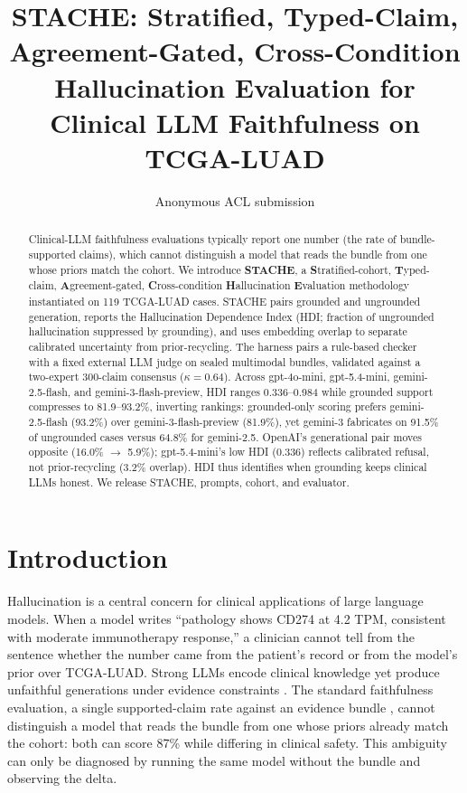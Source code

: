 \documentclass[11pt]{article}
\title{STACHE: Stratified, Typed-Claim, Agreement-Gated, Cross-Condition Hallucination Evaluation for Clinical LLM Faithfulness on TCGA-LUAD}
\author{Anonymous ACL submission}
\begin{document}
\maketitle

\begin{abstract}
Clinical-LLM faithfulness evaluations typically report one number (the rate of bundle-supported claims), which cannot distinguish a model that reads the bundle from one whose priors match the cohort. We introduce \textbf{STACHE}, a \textbf{S}tratified-cohort, \textbf{T}yped-claim, \textbf{A}greement-gated, \textbf{C}ross-condition \textbf{H}allucination \textbf{E}valuation methodology instantiated on 119 TCGA-LUAD cases. STACHE pairs grounded and ungrounded generation, reports the Hallucination Dependence Index (HDI; fraction of ungrounded hallucination suppressed by grounding), and uses embedding overlap to separate calibrated uncertainty from prior-recycling. The harness pairs a rule-based checker with a fixed external LLM judge on sealed multimodal bundles, validated against a two-expert 300-claim consensus ($\kappa=0.64$). Across gpt-4o-mini, gpt-5.4-mini, gemini-2.5-flash, and gemini-3-flash-preview, HDI ranges 0.336--0.984 while grounded support compresses to 81.9--93.2\%, inverting rankings: grounded-only scoring prefers gemini-2.5-flash (93.2\%) over gemini-3-flash-preview (81.9\%), yet gemini-3 fabricates on 91.5\% of ungrounded cases versus 64.8\% for gemini-2.5. OpenAI's generational pair moves opposite (16.0\% $\to$ 5.9\%); gpt-5.4-mini's low HDI (0.336) reflects calibrated refusal, not prior-recycling (3.2\% overlap). HDI thus identifies when grounding keeps clinical LLMs honest. We release STACHE, prompts, cohort, and evaluator.
\end{abstract}

\section{Introduction}
\label{sec:intro}

Hallucination is a central concern for clinical applications of large language models. When a model writes ``pathology shows CD274 at 4.2 TPM, consistent with moderate immunotherapy response,'' a clinician cannot tell from the sentence whether the number came from the patient's record or from the model's prior over TCGA-LUAD. Strong LLMs encode clinical knowledge \citep{singhal2023largelanguagemodelsencode} yet produce unfaithful generations under evidence constraints \citep{ji2023survey,maynez2020faithfulness,pal2023medhalt}. The standard faithfulness evaluation, a single supported-claim rate against an evidence bundle \citep{deyoung2021ms2,tsatsaronis2015bioasq}, cannot distinguish a model that reads the bundle from one whose priors already match the cohort: both can score 87\% while differing in clinical safety. This ambiguity can only be diagnosed by running the same model without the bundle and observing the delta.
\end{document}
